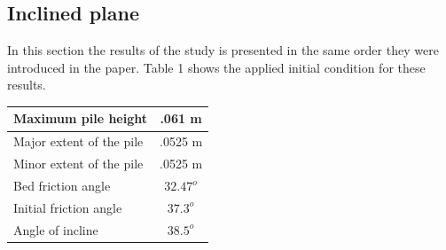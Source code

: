 \documentclass[letterpaper,10pt]{article}
\begin{document}
\subsection{Inclined plane}
In this section the results of the study is presented in the same order they were introduced in the paper.
Table 1 shows the applied initial condition for these results.
\begin{center}
 
\begin{tabular}{|l|c|}

\hline
Maximum pile height       & .061 m \\
\hline
Major extent of the pile  & .0525 m \\
\hline
Minor extent of the pile  & .0525 m \\
\hline           
Bed friction angle        & $32.47^o$ \\
\hline
Initial friction angle    & $37.3^o$ \\
\hline
Angle of incline          & $38.5^o$ \\
\hline
\end{tabular}
\end{center}
\end{document}

